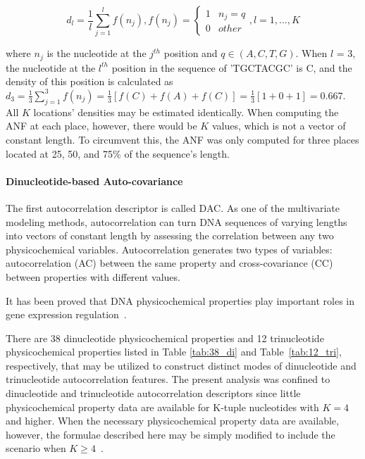 \begin{equation}\label{eq:ANF}
    d_{l} = \frac{1}{l}\sum_{j=1}^{l}f(n_{j}), f(n_{j}) = \begin{cases}1 & n_{j} = q\\0 & other\end{cases}, l = 1,...,K
\end{equation}

\noindent where $n_{j}$ is the nucleotide at the $j^{th}$ position and $q \in (A,C,T,G)$. When $l$ = 3, the nucleotide at the $l^{th}$ position in the sequence of 'TGCTACGC' is C, and the density of this position is calculated as $d_{3} = \frac{1}{3}\sum_{j=1}^{3}f(n_{j}) = \frac{1}{3} [f(C) + f(A) + f(C)] = \frac{1}{3} [1+0+1] = 0.667$. All $K$ locations' densities may be estimated identically. When computing the \gls{ANF} at each place, however, there would be $K$ values, which is not a vector of constant length. To circumvent this, the \gls{ANF} was only computed for three places located at 25, 50, and 75\% of the sequence's length.

\paragraph{Dinucleotide-based Auto-covariance}

The first autocorrelation descriptor is called \gls{DAC}. As one of the multivariate modeling methods, autocorrelation can turn \gls{DNA} sequences of varying lengths into vectors of constant length by assessing the correlation between any two physicochemical variables. Autocorrelation generates two types of variables: autocorrelation (AC) between the same property and cross-covariance (CC) between properties with different values.

It has been proved that \gls{DNA} physicochemical properties play important roles in gene expression regulation~\cite{Brukner1995Sequence-dependentTrinucleotides.,Fukue2005ARelevance}. 

There are 38 dinucleotide physicochemical properties and 12 trinucleotide physicochemical properties listed in Table \ref{tab:38_di} and Table~\ref{tab:12_tri}, respectively, that may be utilized to construct distinct modes of dinucleotide and trinucleotide autocorrelation features. The present analysis was confined to dinucleotide and trinucleotide autocorrelation descriptors since little physicochemical property data are available for K-tuple nucleotides with $K = 4$ and higher. When the necessary physicochemical property data are available, however, the formulae described here may be simply modified to include the scenario when $K \geq 4$~\cite{Chen2014PseKNC:Composition}.


